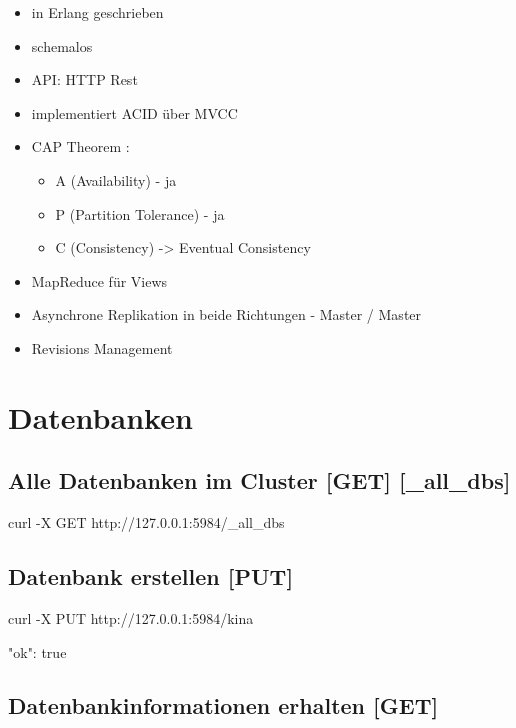 \documentclass[19pt,landscape,twocolumn]{article}
\newcommand{\htmlverb}[1]{{[}\textbf{{#1}}{]}}
\newcommand{\setparskip}{\setlength{\parskip}{-6mm}}
\newcommand{\resetparskip}{\setlength{\parskip}{1mm}}
\begin{document}
\begin{itemize}
  \setlength{\parskip}{0pt}
  \item in Erlang \cite{4} geschrieben
  \item schemalos
  \item API: HTTP Rest \cite{5}
  \item implementiert ACID \cite{6} über MVCC \cite{7}
  \item CAP Theorem \cite{8}:
    \begin{itemize} 
      \item A (Availability) - ja
      \item P (Partition Tolerance) - ja
      \item C (Consistency) -> Eventual Consistency
    \end{itemize}
  \item MapReduce \cite{9} für Views
  \item Asynchrone Replikation in beide Richtungen - Master / Master
  \item Revisions Management
\end{itemize}

\section{Datenbanken}
\subsection{Alle Datenbanken im Cluster \htmlverb{GET} \htmlverb{\_all\_dbs}}

\begin{code}
curl -X GET http://127.0.0.1:5984/_all_dbs
\end{code}
\setparskip
\begin{response}
\end{response}
\resetparskip

\subsection{Datenbank erstellen \htmlverb{PUT}}

\begin{code}
curl -X PUT http://127.0.0.1:5984/kina
\end{code}
\setparskip
\begin{response}
{"ok": true}
\end{response}
\resetparskip

\subsection{Datenbankinformationen erhalten \htmlverb{GET}}
\end{document}
